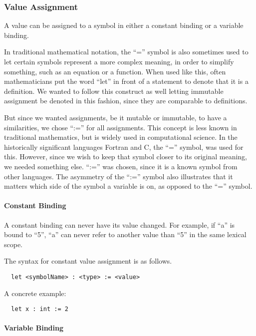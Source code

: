 \subsubsection{Value Assignment}
\label{subsec:value_assignment}

A value can be assigned to a symbol in either a constant binding or a variable binding.

In traditional mathematical notation, the \enquote{=} symbol is also sometimes used to let certain symbols represent a more complex meaning, in order to simplify something, such as an equation or a function. When used like this, often mathematicians put the word \enquote{let} in front of a statement to denote that it is a definition. We wanted to follow this construct as well letting immutable assignment be denoted in this fashion, since they are comparable to definitions. 

But since we wanted assignments, be it mutable or immutable, to have a similarities, we chose \enquote{:=} for all assignments. This concept is less known in traditional mathematics, but is widely used in computational science. In the historically significant languages Fortran and C, the \enquote{=} symbol, was used for this. However, since we wish to keep that symbol closer to its original meaning, we needed something else. \enquote{:=} was chosen, since it is a known symbol from other languages. The asymmetry of the \enquote{:=} symbol also illustrates that it matters which side of the symbol a variable is on, as opposed to the \enquote{=} symbol.

\paragraph{Constant Binding}

A constant binding can never have its value changed. For example, if \enquote{a} is bound to \enquote{5}, \enquote{a} can never refer to another value than \enquote{5} in the same lexical scope. 

The syntax for constant value assignment is as follows.
\begin{verbatim}
  let <symbolName> : <type> := <value>
\end{verbatim}
A concrete example:

\begin{verbatim}
  let x : int := 2
\end{verbatim}

\paragraph{Variable Binding}

